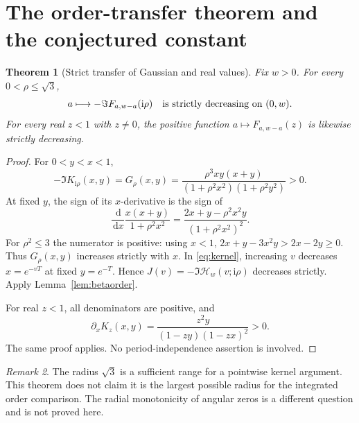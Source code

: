 \documentclass[11pt]{article}
\numberwithin{equation}{section}
\newtheorem{theorem}{Theorem}[section]
\theoremstyle{definition}\newtheorem{definition}[theorem]{Definition}
\theoremstyle{remark}\newtheorem{remark}[theorem]{Remark}
\newcommand{\dd}{\,\mathrm d}
\newcommand{\ii}{\mathrm i}
\newcommand{\HH}{\mathcal H}
\begin{document}
\section{The order-transfer theorem and the conjectured constant}
\label{sec:monotonicity}

\begin{theorem}[Strict transfer of Gaussian and real values]\label{thm:transfer}
Fix $w>0$. For every $0<\rho\le\sqrt3$,
\begin{equation}\label{eq:transfer}
 a\longmapsto-\Im F_{a,w-a}(\ii\rho)
 \quad\hbox{is strictly decreasing on }(0,w).
\end{equation}
For every real $z<1$ with $z\ne0$, the positive function
$a\mapsto F_{a,w-a}(z)$ is likewise strictly decreasing.
\end{theorem}
\begin{proof}
For $0<y<x<1$,
\begin{equation}\label{eq:G}
 -\Im K_{\ii\rho}(x,y)
 =G_\rho(x,y)
 =\frac{\rho^3xy(x+y)}{(1+\rho^2x^2)(1+\rho^2y^2)}>0.
\end{equation}
At fixed $y$, the sign of its $x$-derivative is the sign of
\begin{equation}\label{eq:Gderiv}
 \frac{\dd}{\dd x}\frac{x(x+y)}{1+\rho^2x^2}
 =\frac{2x+y-\rho^2x^2y}{(1+\rho^2x^2)^2}.
\end{equation}
For $\rho^2\le3$ the numerator is positive: using $x<1$,
$2x+y-3x^2y>2x-2y\ge0$. Thus $G_\rho(x,y)$ increases strictly with
$x$. In \eqref{eq:kernel}, increasing $v$ decreases $x=e^{-vT}$ at
fixed $y=e^{-T}$. Hence $J(v)=-\Im\HH_w(v;\ii\rho)$ decreases
strictly. Apply Lemma~\ref{lem:betaorder}.

For real $z<1$, all denominators are positive, and
\[
 \partial_x K_z(x,y)=\frac{z^2y}{(1-zy)(1-zx)^2}>0.
\]
The same proof applies. No period-independence assertion is involved.
\end{proof}

\begin{remark}
The radius $\sqrt3$ is a sufficient range for a pointwise kernel
argument. This theorem does not claim it is the largest possible
radius for the integrated order comparison. The radial monotonicity
of angular zeros is a different question and is not proved here.
\end{remark}
\end{document}

